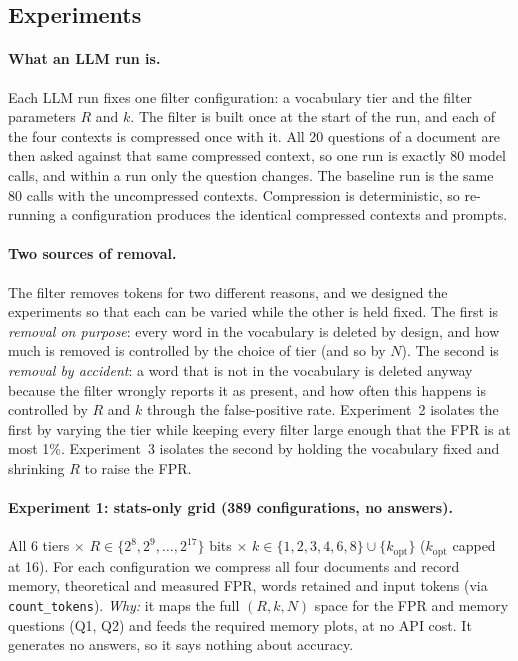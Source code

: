 \documentclass[11pt]{article}
\newcommand{\code}[1]{\texttt{#1}}
\begin{document}
\subsection{Experiments}
\paragraph{What an LLM run is.} Each LLM run fixes one filter configuration: a vocabulary tier and
the filter parameters $R$ and $k$. The filter is built once at the start of the run, and each of the
four contexts is compressed once with it. All 20 questions of a document are then asked against that
same compressed context, so one run is exactly 80 model calls, and within a run only the question
changes. The baseline run is the same 80 calls with the uncompressed contexts. Compression is
deterministic, so re-running a configuration produces the identical compressed contexts and prompts.

\paragraph{Two sources of removal.} The filter removes tokens for two different reasons, and we
designed the experiments so that each can be varied while the other is held fixed. The first is
\emph{removal on purpose}: every word in the vocabulary is deleted by design, and how much is removed
is controlled by the choice of tier (and so by $N$). The second is \emph{removal by accident}: a
word that is not in the vocabulary is deleted anyway because the filter wrongly reports it as present,
and how often this happens is controlled by $R$ and $k$ through the false-positive rate.
Experiment~2 isolates the first by varying the tier while keeping every filter large enough that the
FPR is at most 1\%. Experiment~3 isolates the second by holding the vocabulary fixed and shrinking $R$
to raise the FPR.

\paragraph{Experiment 1: stats-only grid (389 configurations, no answers).}
All 6 tiers $\times$ $R \in \{2^8, 2^9, \dots, 2^{17}\}$ bits $\times$
$k \in \{1,2,3,4,6,8\} \cup \{k_{\mathrm{opt}}\}$ ($k_{\mathrm{opt}}$ capped at 16). For each
configuration we compress all four documents and record memory, theoretical and measured FPR, words
retained and input tokens (via \code{count\_tokens}). \emph{Why:} it maps the full $(R,k,N)$ space
for the FPR and memory questions (Q1, Q2) and feeds the required memory plots, at no API cost. It
generates no answers, so it says nothing about accuracy.
\end{document}

